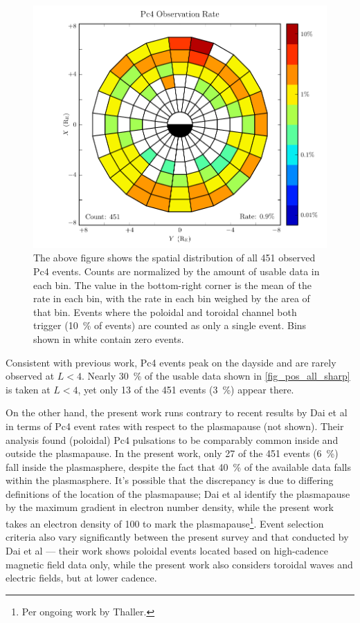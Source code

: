 \begin{figure}[!htb]
  \centering
  \includegraphics[width=\textwidth]{figures/rate_all_sharp.pdf}
  \caption[Rate of Pc4 Events]{
    The above figure shows the spatial distribution of all 451 observed Pc4
    events. Counts are normalized by the amount of usable data in each bin. The
    value in the bottom-right corner is the mean of the rate in each bin, with
    the rate in each bin weighed by the area of that bin. Events where the
    poloidal and toroidal channel both trigger (\about\SI{10}{\percent} of
    events) are counted as only a single event. Bins shown in white contain
    zero events. 
  }
  \label{fig_rate_all_sharp}
\end{figure}

Consistent with previous
work\cite{anderson_1990,dai_2015,kokubun_1989,liu_2009}, Pc4 events peak on the
dayside and are rarely
observed at $L < 4$. Nearly \SI{30}{\percent} of the usable data shown in
\cref{fig_pos_all_sharp} is taken at $L < 4$, yet only 13 of the 451 events
(\SI{3}{\percent}) appear there. 

On the other hand, the present work runs contrary to recent results by Dai et
al in terms
of Pc4 event rates with respect to the plasmapause (not shown). Their analysis
found (poloidal) Pc4 pulsations to be comparably common inside and outside the
plasmapause\cite{dai_2015}. In the present work, only 27 of the 451 events
(\SI{6}{\percent}) fall inside the plasmasphere, despite the fact that
\SI{40}{\percent} of the available data falls within the plasmasphere. 
It's possible that the discrepancy is due to differing definitions of the
location of the plasmapause; Dai et al
identify the plasmapause by the maximum gradient in electron number density,
while the present work takes an electron density of \SI{100}{\percc} to mark
the plasmapause\footnote{Per ongoing work by Thaller. }. Event selection
criteria also vary significantly between the present survey and that conducted
by Dai et al --- their work shows poloidal events located based on high-cadence
magnetic field data only, while the present work also considers toroidal waves
and electric fields, but at lower cadence. 


